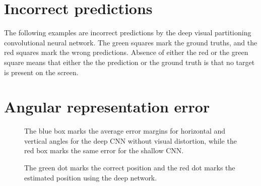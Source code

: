 \section{Incorrect predictions}
\label{sec:incorrectpredictions}
The following examples are incorrect predictions by the deep visual partitioning convolutional neural network. The green squares mark the ground truths, and the red squares mark the wrong predictions. Absence of either the red or the green square means that either the the prediction  or the ground truth is that no target is present on the screen.

\begin{figure}[H]
	\begin{center}
	\begin{scriptsize}
		\sffamily
		\def\svgwidth{0.95\textwidth}
		
	\end{scriptsize}
	\end{center}
\end{figure}


\begin{figure}[H]
	\begin{center}
	\begin{scriptsize}
		\sffamily
		\def\svgwidth{0.95\textwidth}
		
	\end{scriptsize}
	\end{center}
\end{figure}

\section{Angular representation error}
\label{sec:angular-error}
\begin{figure}[H]
	\begin{center}
	\begin{scriptsize}
		\sffamily
		\def\svgwidth{1\textwidth}
		
	\end{scriptsize}
	\end{center}
	\caption[AR mean error visualised]{The blue box marks the average error margins for horizontal and vertical angles for the deep CNN without visual distortion, while the red box marks the same error for the shallow CNN.}
	\label{fig:angularerror}
\end{figure}

\begin{figure}[H]
	\begin{center}
	\begin{scriptsize}
		\sffamily
		\def\svgwidth{0.9\textwidth}
		
	\end{scriptsize}
	\end{center}
	\caption[AR error examples visualised]{The green dot marks the correct position and the red dot marks the estimated position using the deep network.}
	\label{fig:aecollection}
\end{figure}

